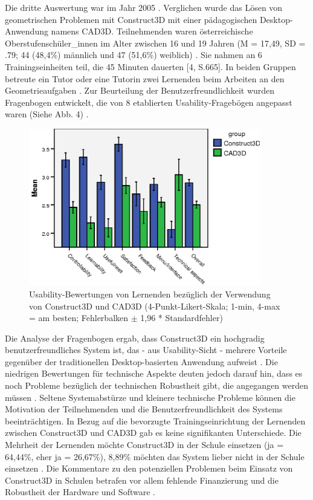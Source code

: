 \documentclass[deutsch]{llncs}
\begin{document}
\noindent Die dritte Auswertung war im Jahr 2005 \cite{Kaufmann_summaryof}. Verglichen wurde das Lösen von geometrischen Problemen mit Construct3D mit einer pädagogischen Desktop-Anwendung namens CAD3D. Teilnehmenden waren österreichische Oberstufenschüler\_innen im Alter zwischen 16 und 19 Jahren (M = 17,49, SD = .79; 44 (48,4\%) männlich und 47 (51,6\%) weiblich) \cite{Kaufmann_summaryof}. Sie nahmen an 6 Trainingseinheiten teil, die 45 Minuten dauerten [4, S.665]. In beiden Gruppen betreute ein Tutor oder eine Tutorin zwei Lernenden beim Arbeiten an den Geometrieaufgaben  \cite{Kaufmann_summaryof}. Zur Beurteilung der Benutzerfreundlichkeit wurden Fragenbogen entwickelt, die von 8 etablierten Usability-Fragebögen angepasst waren (Siehe Abb. \label{stat1}4)  \cite{Kaufmann_summaryof}.
\begin{figure}[t]
	\centering
	\includegraphics[width=0.9\textwidth]{figures/stat1}
	\caption{Usability-Bewertungen von Lernenden bezüglich der Verwendung von Construct3D und CAD3D (4-Punkt-Likert-Skala; 1-min, 4-max = am besten; Fehlerbalken $\pm$ 1,96 * Standardfehler)\cite{Kaufmann_summaryof}}
	\label{fig:stat1}
\end{figure}
Die Analyse der Fragenbogen ergab, dass Construct3D ein hochgradig benutzerfreundliches System ist, das - aus Usability-Sicht - mehrere Vorteile gegenüber der traditionellen Desktop-basierten Anwendung aufweist \cite{Kaufmann_summaryof}. Die niedrigen Bewertungen für technische Aspekte deuten jedoch darauf hin, dass es noch Probleme bezüglich der technischen Robustheit gibt, die angegangen werden müssen \cite{Kaufmann_summaryof}. Seltene Systemabstürze und kleinere technische Probleme können die Motivation der Teilnehmenden und die Benutzerfreundlichkeit des Systems beeinträchtigen. In Bezug auf die bevorzugte Trainingseinrichtung der Lernenden zwischen Construct3D und CAD3D gab es keine signifikanten Unterschiede. Die Mehrheit der Lernenden möchte Construct3D in der Schule einsetzen (ja = 64,44\%, eher ja = 26,67\%), 8,89\% möchten das System lieber nicht in der Schule einsetzen \cite{Kaufmann_summaryof}.  Die Kommentare zu den potenziellen Problemen beim Einsatz von Construct3D in Schulen betrafen vor allem fehlende Finanzierung und die Robustheit der Hardware und Software \cite{Kaufmann_summaryof}.\\
\end{document}
